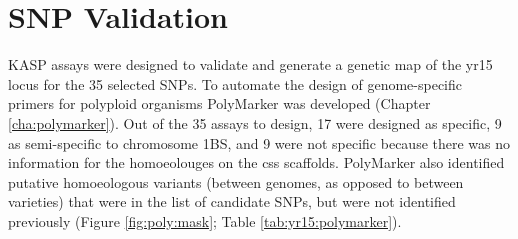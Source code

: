\section {SNP Validation}

KASP assays were designed to validate and generate a genetic map of the \acrshort{yr15} locus for the 35 selected SNPs.
To automate the design of genome-specific primers for polyploid organisms PolyMarker was developed (Chapter \ref{cha:polymarker}).
Out of the 35 assays to design, 17 were designed as specific, 9 as semi-specific to chromosome 1BS, and 9 were not specific because there was no information for the homoeolouges on the \acrshort{css} scaffolds. 
PolyMarker also identified putative homoeologous variants (between genomes, as opposed to between varieties) that were in the list of candidate SNPs, but were not identified previously (Figure \ref{fig:poly:mask}; Table \ref{tab:yr15:polymarker}). 


